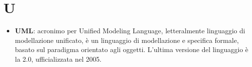 \section{U}
\begin{itemize} 
	\item \textbf{UML}: acronimo per Unified Modeling Language, letteralmente linguaggio di modellazione unificato, è un linguaggio di modellazione e specifica formale, basato sul paradigma orientato agli oggetti. L'ultima versione del linguaggio è la 2.0, ufficializzata nel 2005.
\end{itemize}